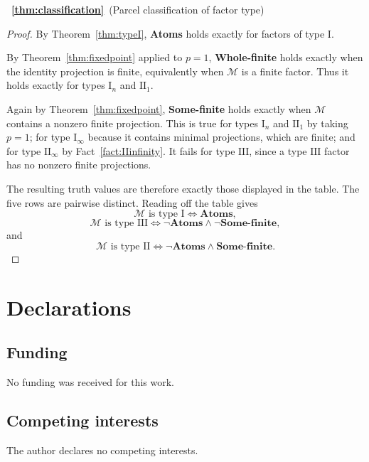 \documentclass[11pt]{article}
\begin{document}
~{\bf \ref{thm:classification}}~(Parcel classification of factor type)
\begin{proof}
By Theorem~\ref{thm:typeI}, \textbf{Atoms} holds exactly for factors of
type $\mathrm I$.

By Theorem~\ref{thm:fixedpoint} applied to $p=1$,
\textbf{Whole-finite} holds exactly when the identity projection is
finite, equivalently when $\mathcal M$ is a finite factor. Thus it
holds exactly for types $\mathrm I_n$ and $\mathrm{II}_1$.

Again by Theorem~\ref{thm:fixedpoint}, \textbf{Some-finite} holds
exactly when $\mathcal M$ contains a nonzero finite projection. This is
true for types $\mathrm I_n$ and $\mathrm{II}_1$ by taking $p=1$; for
type $\mathrm I_\infty$ because it contains minimal projections, which
are finite; and for type $\mathrm{II}_\infty$ by
Fact~\ref{fact:IIinfinity}. It fails for type $\mathrm{III}$, since a
type $\mathrm{III}$ factor has no nonzero finite projections.

The resulting truth values are therefore exactly those displayed in the
table. The five rows are pairwise distinct. Reading off the table gives
\[
\mathcal M\text{ is type }\mathrm I
\iff
\textbf{Atoms},
\]
\[
\mathcal M\text{ is type }\mathrm{III}
\iff
\neg\textbf{Atoms}\wedge\neg\textbf{Some-finite},
\]
and
\[
\mathcal M\text{ is type }\mathrm{II}
\iff
\neg\textbf{Atoms}\wedge\textbf{Some-finite}.
\]
\end{proof}






\section*{Declarations}

\subsection*{Funding}
No funding was received for this work.

\subsection*{Competing interests}
The author declares no competing interests.







\end{document}
